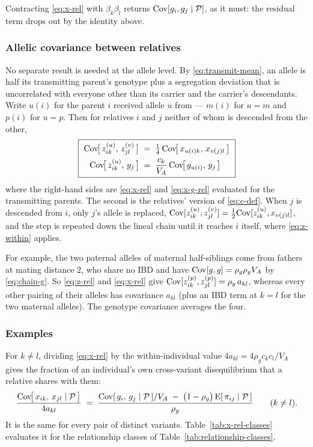 \documentclass[12pt]{article}
\begin{document}
Contracting \eqref{eq:x-rel} with $\beta_k\beta_l$ returns $\mathrm{Cov}[g_i, g_j \mid \mathcal{P}]$, as it must: the residual term drops out by the identity above.

\subsubsection{Allelic covariance between relatives}\label{sec:am-allele-rel}
No separate result is needed at the allele level.
By \eqref{eq:transmit-mean}, an allele is half its transmitting parent's genotype plus a segregation deviation that is uncorrelated with everyone other than its carrier and the carrier's descendants.
Write $u(i)$ for the parent $i$ received allele $u$ from --- $m(i)$ for $u = m$ and $p(i)$ for $u = p$.
Then for relatives $i$ and $j$ neither of whom is descended from the other,
\begin{equation}\label{eq:z-rel}
    \boxed{\ \begin{aligned}
    \mathrm{Cov}\!\big[\,z^{(u)}_{ik},\, z^{(v)}_{jl}\,\big] \;&=\; \tfrac14\,\mathrm{Cov}\!\big[\,x_{u(i)k},\, x_{v(j)l}\,\big] \\
    \mathrm{Cov}\!\big[\,z^{(u)}_{ik},\, y_{j}\,\big] \;&=\; \frac{c_k}{V_A}\,\mathrm{Cov}\!\big[\,g_{u(i)},\, y_{j}\,\big]
    \end{aligned} \ }
\end{equation}
where the right-hand sides are \eqref{eq:x-rel} and \eqref{eq:x-g-rel} evaluated for the transmitting parents.
The second is the relatives' version of \eqref{eq:c-def}.
When $j$ is descended from $i$, only $j$'s allele is replaced, $\mathrm{Cov}[z^{(u)}_{ik}, z^{(v)}_{jl}] = \tfrac12\mathrm{Cov}[z^{(u)}_{ik}, x_{v(j)l}]$, and the step is repeated down the lineal chain until it reaches $i$ itself, where \eqref{eq:z-within} applies.

For example, the two paternal alleles of maternal half-siblings come from fathers at mating distance $2$, who share no IBD and have $\mathrm{Cov}[g, g] = \rho_g\rho_y V_A$ by \eqref{eq:chain-g}.
So \eqref{eq:z-rel} and \eqref{eq:x-rel} give $\mathrm{Cov}[z^{(p)}_{ik}, z^{(p)}_{jl}] = \rho_y\, a_{kl}$, whereas every other pairing of their alleles has covariance $a_{kl}$ (plus an IBD term at $k = l$ for the two maternal alleles).
The genotype covariance averages the four.

\subsubsection{Examples}\label{sec:am-geno-examples}
For $k \neq l$, dividing \eqref{eq:x-rel} by the within-individual value $4a_{kl} = 4\rho_g c_k c_l / V_A$ gives the fraction of an individual's own cross-variant disequilibrium that a relative shares with them:
\begin{equation}\label{eq:x-rel-ratio}
    \frac{\mathrm{Cov}\!\big[\,x_{ik},\, x_{jl} \mid \mathcal{P}\,\big]}{4a_{kl}}
    \;=\; \frac{\mathrm{Cov}[\,g_i,\, g_j \mid \mathcal{P}\,]/V_A \;-\; \big(1-\rho_g\big)\,\mathrm{E}[\,\pi_{ij} \mid \mathcal{P}\,]}{\rho_g}
    \qquad (k \neq l) .
\end{equation}
It is the same for every pair of distinct variants.
Table~\ref{tab:x-rel-classes} evaluates it for the relationship classes of Table~\ref{tab:relationship-classes}.
\end{document}
